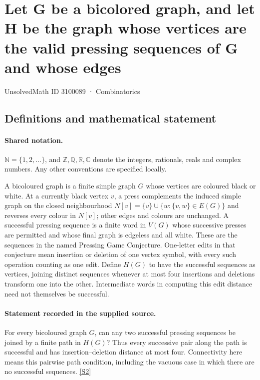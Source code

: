 \documentclass[11pt]{article}
\newcommand{\sref}[2]{\hyperlink{source:#1:#2}{[S#2]}}
\begin{document}
\setcounter{section}{3100088}
\section{Let G be a bicolored graph, and let H be the graph whose vertices are the valid pressing sequences of G and whose edges}\label{3100089}
{\small\sffamily UnsolvedMath ID 3100089 · Combinatorics}
\subsection{Definitions and mathematical statement}

\paragraph{Shared notation.}$\mathbb N=\{1,2,\ldots\}$, and $\mathbb Z,\mathbb Q,\mathbb R,\mathbb C$ denote the integers, rationals, reals and complex numbers. Any other conventions are specified locally.


A bicoloured graph is a finite simple graph $G$ whose vertices are coloured black or white. At a currently black vertex $v$, a press complements the induced simple graph on the closed neighbourhood $N[v]=\{v\}\cup\{w:\{v,w\}\in E(G)\}$ and reverses every colour in $N[v]$; other edges and colours are unchanged. A successful pressing sequence is a finite word in $V(G)$ whose successive presses are permitted and whose final graph is edgeless and all white. These are the sequences in the named Pressing Game Conjecture. One-letter edits in that conjecture mean insertion or deletion of one vertex symbol, with every such operation counting as one edit.
Define $H(G)$ to have the successful sequences as vertices, joining distinct sequences whenever at most four insertions and deletions transform one into the other. Intermediate words in computing this edit distance need not themselves be successful.

\paragraph{Statement recorded in the supplied source.}
For every bicoloured graph $G$, can any two successful pressing sequences be joined by a finite path in $H(G)$? Thus every successive pair along the path is successful and has insertion--deletion distance at most four. Connectivity here means this pairwise path condition, including the vacuous case in which there are no successful sequences. \sref{3100089}{2}
\end{document}
